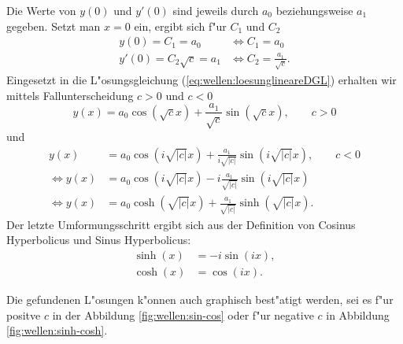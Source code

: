 Die Werte von $y(0)$ und $y'(0)$ sind jeweils durch $a_0$ beziehungsweise $a_1$ 
gegeben. Setzt man $x = 0$ ein, ergibt sich f"ur $C_1$ und $C_2$
\begin{equation}
	\begin{split}
		y(0) = C_1 = a_0 &\Leftrightarrow C_1 = a_0 \\
		y'(0) = C_2 \sqrt{c} = a_1 &\Leftrightarrow C_2 = \frac{a_1}{\sqrt{c}}.
	\end{split}
\end{equation}
Eingesetzt in die L"osungsgleichung (\ref{eq:wellen:loesunglineareDGL}) 
erhalten wir mittels Fallunterscheidung $c > 0$ und $c < 0$
\begin{equation*}
	y(x) = a_0 \cos(\sqrt{c}x) + \frac{a_1}{\sqrt{c}} \sin(\sqrt{c}x), \qquad c 
	> 0
\end{equation*}
und
\begin{equation}
	\begin{split}
		y(x) &= a_0 \cos(i\sqrt{|c|}x) + 
		\frac{a_1}{i\sqrt{|c|}}\sin(i\sqrt{|c|}x), \qquad c < 0\\
		\Leftrightarrow
		y(x) &= a_0 \cos(i\sqrt{|c|}x) - 
		i\frac{a_1}{\sqrt{|c|}}\sin(i\sqrt{|c|}x)\\
		\Leftrightarrow
		y(x) &= a_0 \cosh(\sqrt{|c|}x) + 
		\frac{a_1}{\sqrt{|c|}}\sinh(\sqrt{|c|}x).
	\end{split}	
\end{equation}
Der letzte Umformungsschritt ergibt sich aus der Definition von Cosinus 
Hyperbolicus und Sinus Hyperbolicus:
\begin{equation*}
	\begin{split}
		\sinh(x) &= -i \sin(ix),\\
		\cosh(x) &= \cos (ix).
	\end{split}
\end{equation*}

Die gefundenen L"osungen k"onnen auch graphisch best"atigt werden, sei es f"ur 
positve $c$ in der Abbildung \ref{fig:wellen:sin-cos} oder f"ur negative $c$ 
in Abbildung \ref{fig:wellen:sinh-cosh}.

